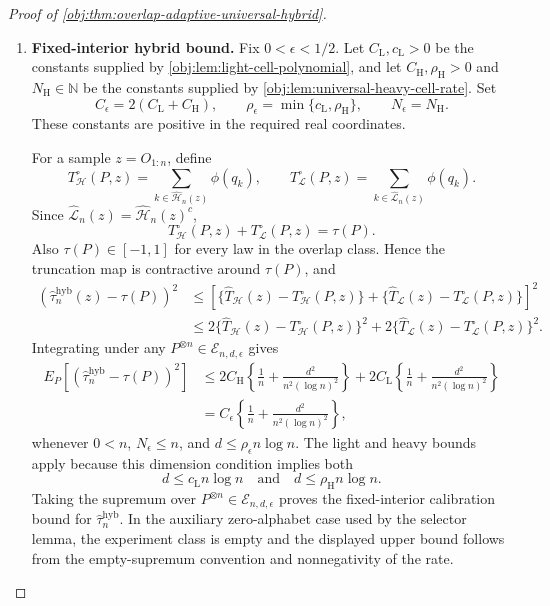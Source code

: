 \documentclass[11pt]{article}
\begin{document}
\begin{proof}[Proof of \cref{obj:thm:overlap-adaptive-universal-hybrid}]
\begin{enumerate}
\item \textbf{Fixed-interior hybrid bound.}
Fix \(0<\epsilon<1/2\).  Let \(C_{\mathrm L},c_{\mathrm L}>0\) be the constants supplied by \cref{obj:lem:light-cell-polynomial}, and let \(C_{\mathrm H},\rho_{\mathrm H}>0\) and \(N_{\mathrm H}\in\mathbb N\) be the constants supplied by \cref{obj:lem:universal-heavy-cell-rate}.  Set
\[
C_\epsilon=2(C_{\mathrm L}+C_{\mathrm H}),
\qquad
\rho_\epsilon=\min\{c_{\mathrm L},\rho_{\mathrm H}\},
\qquad
N_\epsilon=N_{\mathrm H}.
\]
These constants are positive in the required real coordinates.

For a sample \(z=O_{1:n}\), define
\[
T_{\mathcal H}^{\circ}(P,z)
=
\sum_{k\in\widehat{\mathcal H}_n(z)}\phi(q_k),
\qquad
T_{\mathcal L}^{\circ}(P,z)
=
\sum_{k\in\widehat{\mathcal L}_n(z)}\phi(q_k).
\]
Since \(\widehat{\mathcal L}_n(z)=\widehat{\mathcal H}_n(z)^c\),
\[
T_{\mathcal H}^{\circ}(P,z)+T_{\mathcal L}^{\circ}(P,z)=\tau(P).
\]
Also \(\tau(P)\in[-1,1]\) for every law in the overlap class.  Hence the truncation map is contractive around \(\tau(P)\), and
\[
\begin{aligned}
\left(\widehat\tau_n^{\mathrm{hyb}}(z)-\tau(P)\right)^2
&\le
\left[
\{\widehat T_{\mathcal H}(z)-T_{\mathcal H}^{\circ}(P,z)\}
+
\{\widehat T_{\mathcal L}(z)-T_{\mathcal L}^{\circ}(P,z)\}
\right]^2  \\
&\le
2\{\widehat T_{\mathcal H}(z)-T_{\mathcal H}^{\circ}(P,z)\}^2
+
2\{\widehat T_{\mathcal L}(z)-T_{\mathcal L}^{\circ}(P,z)\}^2 .
\end{aligned}
\]
Integrating under any \(P^{\otimes n}\in\mathcal E_{n,d,\epsilon}\) gives
\[
\begin{aligned}
E_P\!\left[
\left(\widehat\tau_n^{\mathrm{hyb}}-\tau(P)\right)^2
\right]
&\le
2C_{\mathrm H}\left\{\frac1n+\frac{d^2}{n^2(\log n)^2}\right\}
+
2C_{\mathrm L}\left\{\frac1n+\frac{d^2}{n^2(\log n)^2}\right\}  \\
&=
C_\epsilon\left\{\frac1n+\frac{d^2}{n^2(\log n)^2}\right\},
\end{aligned}
\]
whenever \(0<n\), \(N_\epsilon\le n\), and \(d\le\rho_\epsilon n\log n\).  The light and heavy bounds apply because this dimension condition implies both
\[
d\le c_{\mathrm L}n\log n
\quad\text{and}\quad
d\le \rho_{\mathrm H}n\log n .
\]
Taking the supremum over \(P^{\otimes n}\in\mathcal E_{n,d,\epsilon}\) proves the fixed-interior calibration bound for \(\widehat\tau_n^{\mathrm{hyb}}\).  In the auxiliary zero-alphabet case used by the selector lemma, the experiment class is empty and the displayed upper bound follows from the empty-supremum convention and nonnegativity of the rate.


\end{enumerate}
\end{proof}
\end{document}
